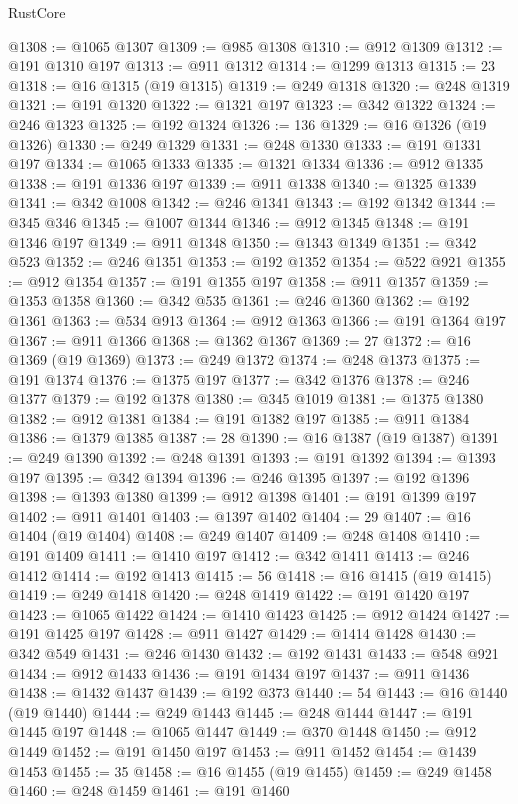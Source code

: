 \begin{lexlean}{RustCore}
\begin{coremodule}
@1308 := @1065 @1307
@1309 := @985 @1308
@1310 := @912 @1309
@1312 := @191 @1310 @197
@1313 := @911 @1312
@1314 := @1299 @1313
@1315 := 23
@1318 := @16 @1315 (@19 @1315)
@1319 := @249 @1318
@1320 := @248 @1319
@1321 := @191 @1320
@1322 := @1321 @197
@1323 := @342 @1322
@1324 := @246 @1323
@1325 := @192 @1324
@1326 := 136
@1329 := @16 @1326 (@19 @1326)
@1330 := @249 @1329
@1331 := @248 @1330
@1333 := @191 @1331 @197
@1334 := @1065 @1333
@1335 := @1321 @1334
@1336 := @912 @1335
@1338 := @191 @1336 @197
@1339 := @911 @1338
@1340 := @1325 @1339
@1341 := @342 @1008
@1342 := @246 @1341
@1343 := @192 @1342
@1344 := @345 @346
@1345 := @1007 @1344
@1346 := @912 @1345
@1348 := @191 @1346 @197
@1349 := @911 @1348
@1350 := @1343 @1349
@1351 := @342 @523
@1352 := @246 @1351
@1353 := @192 @1352
@1354 := @522 @921
@1355 := @912 @1354
@1357 := @191 @1355 @197
@1358 := @911 @1357
@1359 := @1353 @1358
@1360 := @342 @535
@1361 := @246 @1360
@1362 := @192 @1361
@1363 := @534 @913
@1364 := @912 @1363
@1366 := @191 @1364 @197
@1367 := @911 @1366
@1368 := @1362 @1367
@1369 := 27
@1372 := @16 @1369 (@19 @1369)
@1373 := @249 @1372
@1374 := @248 @1373
@1375 := @191 @1374
@1376 := @1375 @197
@1377 := @342 @1376
@1378 := @246 @1377
@1379 := @192 @1378
@1380 := @345 @1019
@1381 := @1375 @1380
@1382 := @912 @1381
@1384 := @191 @1382 @197
@1385 := @911 @1384
@1386 := @1379 @1385
@1387 := 28
@1390 := @16 @1387 (@19 @1387)
@1391 := @249 @1390
@1392 := @248 @1391
@1393 := @191 @1392
@1394 := @1393 @197
@1395 := @342 @1394
@1396 := @246 @1395
@1397 := @192 @1396
@1398 := @1393 @1380
@1399 := @912 @1398
@1401 := @191 @1399 @197
@1402 := @911 @1401
@1403 := @1397 @1402
@1404 := 29
@1407 := @16 @1404 (@19 @1404)
@1408 := @249 @1407
@1409 := @248 @1408
@1410 := @191 @1409
@1411 := @1410 @197
@1412 := @342 @1411
@1413 := @246 @1412
@1414 := @192 @1413
@1415 := 56
@1418 := @16 @1415 (@19 @1415)
@1419 := @249 @1418
@1420 := @248 @1419
@1422 := @191 @1420 @197
@1423 := @1065 @1422
@1424 := @1410 @1423
@1425 := @912 @1424
@1427 := @191 @1425 @197
@1428 := @911 @1427
@1429 := @1414 @1428
@1430 := @342 @549
@1431 := @246 @1430
@1432 := @192 @1431
@1433 := @548 @921
@1434 := @912 @1433
@1436 := @191 @1434 @197
@1437 := @911 @1436
@1438 := @1432 @1437
@1439 := @192 @373
@1440 := 54
@1443 := @16 @1440 (@19 @1440)
@1444 := @249 @1443
@1445 := @248 @1444
@1447 := @191 @1445 @197
@1448 := @1065 @1447
@1449 := @370 @1448
@1450 := @912 @1449
@1452 := @191 @1450 @197
@1453 := @911 @1452
@1454 := @1439 @1453
@1455 := 35
@1458 := @16 @1455 (@19 @1455)
@1459 := @249 @1458
@1460 := @248 @1459
@1461 := @191 @1460

\end{coremodule}
\end{lexlean}
